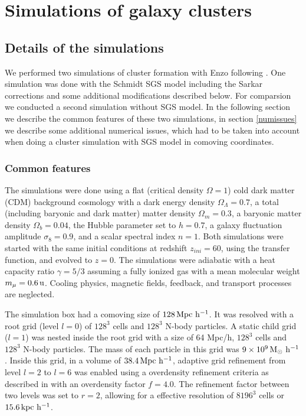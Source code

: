 \chapter{Simulations of galaxy clusters}\label{clustersim}
\section{Details of the simulations}
We performed two simulations of cluster formation with Enzo following
\citet{Iapichino2008}. One simulation was done with the Schmidt SGS model
including the Sarkar corrections and some additional modifications described
below. For comparsion we conducted a second simulation without SGS model. In the
following section we describe the common features of these two simulations, in
section \ref{numissues} we describe some additional numerical issues, which had
to be taken into account when doing a cluster simulation with SGS model in
comoving coordinates. 
\subsection{Common features}\label{common}
The simulations were done using a flat (critical density $\Omega=1$) cold dark
matter (CDM) background cosmology with a dark energy density
$\Omega_{\Lambda}=0.7$, a total (including baryonic and dark matter) matter
density $\Omega_{m}=0.3$, a baryonic matter density $\Omega_{b}=0.04$, the
Hubble parameter set to $h=0.7$, a galaxy fluctuation amplitude $\sigma_8=0.9$,
and a scalar spectral index $n=1$. Both simulations were started with the same
initial conditions at redshift $z_{ini}=60$, using the \citet{Eisenstein1999}
transfer function, and evolved to $z=0$. The simulations were adiabatic with a
heat capacity ratio $\gamma=5/3$ assuming a fully ionized gas with a mean
molecular weight $m_{\mu}= \unit[0.6]{u}$. Cooling physics, magnetic fields,
feedback, and transport processes are neglected. 

The simulation box had a comoving size of $\unit[128]{Mpc\ h^{-1}}$. It was
resolved with a root grid (level $l=0$) of $128^3$ cells and $128^3$ N-body
particles. A static child grid ($l=1$) was nested inside the root grid with a
size of 
64 Mpc/h, $128^3$ cells and $128^3$ N-body particles. The mass of each particle
in this grid was $\unit[9 \times 10^9]{M_{\odot}\ h^{-1}}$. Inside this grid, in
a volume of $\unit[38.4]{Mpc\ h^{-1}}$, adaptive grid refinement from level
$l=2$ to $l=6$ was enabled using a overdensity refinement criteria as described
in \citet{Iapichino2008} with an overdensity factor $f=4.0$. The refinement
factor between two levels was set to $r=2$, allowing for a effective resolution
of $8196^3$ cells or $\unit[15.6]{kpc\ h^{-1}}$.

